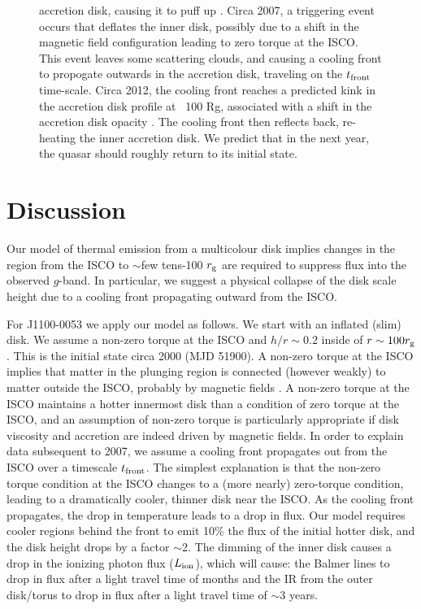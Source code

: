 \documentclass{nature}
\begin{document}
\begin{figure}
{    accretion disk, causing it to puff up \citet[e.g.,][]{33}.  Circa 2007, a
    triggering event occurs that deflates the inner disk, possibly due
    to a shift in the magnetic field configuration leading to zero
    torque at the ISCO.  This event leaves some scattering clouds, and
    causing a cooling front to propogate outwards in the accretion disk,
    traveling on the $t_{\rm front}$ time-scale. Circa 2012, the cooling front
    reaches a predicted kink in the accretion disk profile at ~100 Rg,
    associated with a shift in the accretion disk opacity \citet[e.g., Figure
    2 of ][]{33}.  The cooling front then reflects back, re-heating the
    inner accretion disk. We predict that in the next year, the quasar
    should roughly return to its initial state.}
  \label{fig:J110057_diskmodel}
\end{figure}
\section{Discussion}   
Our model of thermal emission from a multicolour disk implies 
changes in the region from the ISCO to $\sim$few tens-100 $r_{\rm g}$
are required to suppress flux into the observed
$g$-band. In particular, we suggest a physical collapse of the disk
scale height due to a cooling front propagating outward from the ISCO.

For J1100-0053 we apply our model as follows. We start with an
inflated (slim) disk. We assume a non-zero torque at the ISCO and
$h/r\sim0.2$ inside of $r\sim100 r_{\rm g}$. This is the initial state
circa 2000 (MJD 51900). A non-zero torque at the ISCO implies that
matter in the plunging region is connected (however weakly) to matter
outside the ISCO, probably by magnetic fields \cite[e.g.,
][]{Gammie1999, Agol_Krolik2000}. A non-zero torque at the ISCO
maintains a hotter innermost disk than a condition of zero torque at
the ISCO, and an assumption of non-zero torque is particularly
appropriate if disk viscosity and accretion are indeed driven by
magnetic fields. In order to explain data subsequent to 2007, we
assume a cooling front propagates out from the ISCO over a timescale
$t_{\rm front}$. The simplest explanation is that the non-zero torque
condition at the ISCO changes to a (more nearly) zero-torque
condition, leading to a dramatically cooler, thinner disk near the
ISCO. As the cooling front propagates, the drop in temperature leads
to a drop in flux. Our model requires cooler regions behind the front
to emit 10\% the flux of the initial hotter disk, and the disk height
drops by a factor $\sim$2. The dimming of the inner disk causes a drop
in the ionizing photon flux ($L_{\rm ion}$), which will cause: the
Balmer lines to drop in flux after a light travel time of months and
the IR from the outer disk/torus to drop in flux after a light travel
time of $\sim$3 years.
\end{document}
